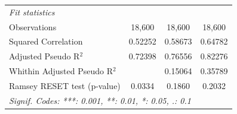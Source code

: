 \begin{tabular}{lccc}
   \midrule
   \emph{Fit statistics}\\
   Observations                  & 18,600  & 18,600          & 18,600\\  
   Squared Correlation           & 0.52252 & 0.58673         & 0.64782\\  
   Adjusted Pseudo R$^2$         & 0.72398 & 0.76556         & 0.82276\\  
   Whithin Adjusted Pseudo R$^2$ &         & 0.15064         & 0.35789\\  
   Ramsey RESET test (p-value)   & 0.0334  & 0.1860          & 0.2032\\  
   \midrule \midrule
   \multicolumn{4}{l}{\emph{Signif. Codes: ***: 0.001, **: 0.01, *: 0.05, .: 0.1}}\\
\end{tabular}
\par\endgroup


